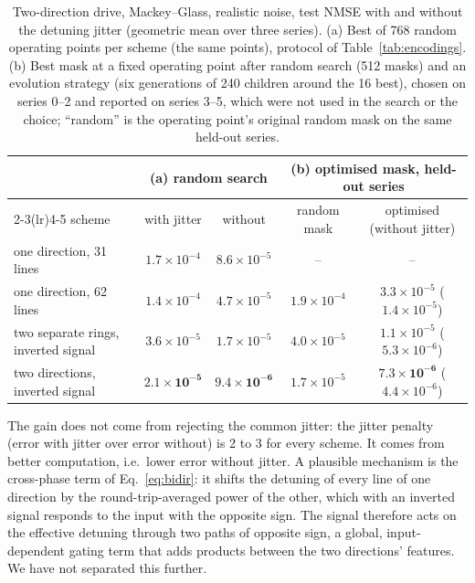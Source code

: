 \begin{table}[htbp]
\centering
\caption{Two-direction drive, Mackey--Glass, realistic noise, test NMSE with and without the detuning jitter (geometric mean over
three series). (a) Best of 768 random operating points per scheme (the same points), protocol of Table~\ref{tab:encodings}.
(b) Best mask at a fixed operating point after random search (512 masks) and an evolution strategy (six generations of 240 children
around the 16 best), chosen on series 0--2 and reported on series 3--5, which were not used in the search or the choice; ``random''
is the operating point's original random mask on the same held-out series.}
\label{tab:bidir}
\footnotesize\setlength{\tabcolsep}{4pt}
\begin{tabular}{lcccc}
\toprule
 & \multicolumn{2}{c}{(a) random search} & \multicolumn{2}{c}{(b) optimised mask, held-out series} \\
\cmidrule(lr){2-3}\cmidrule(lr){4-5}
scheme & with jitter & without & random mask & optimised (without jitter) \\
\midrule
one direction, 31 lines & $1.7\times10^{-4}$ & $8.6\times10^{-5}$ & -- & -- \\
one direction, 62 lines & $1.4\times10^{-4}$ & $4.7\times10^{-5}$ & $1.9\times10^{-4}$ & $3.3\times10^{-5}$ ($1.4\times10^{-5}$) \\
two separate rings, inverted signal & $3.6\times10^{-5}$ & $1.7\times10^{-5}$ & $4.0\times10^{-5}$ & $1.1\times10^{-5}$ ($5.3\times10^{-6}$) \\
two directions, inverted signal & $\mathbf{2.1\times10^{-5}}$ & $\mathbf{9.4\times10^{-6}}$ & $1.7\times10^{-5}$ & $\mathbf{7.3\times10^{-6}}$ ($4.4\times10^{-6}$) \\
\bottomrule
\end{tabular}
\end{table}

The gain does not come from rejecting the common jitter: the jitter penalty (error with jitter over error without) is 2 to 3 for
every scheme. It comes from better computation, i.e.\ lower error without jitter. A plausible mechanism is the cross-phase term of
Eq.~\eqref{eq:bidir}: it shifts the detuning of every line of one direction by the round-trip-averaged power of the other, which with an
inverted signal responds to the input with the opposite sign. The signal therefore acts on the effective detuning through two paths of
opposite sign, a global, input-dependent gating term that adds products between the two directions' features. We have not separated
this further.

